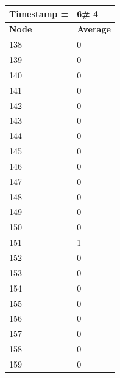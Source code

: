 \begin{tabular}{|l||l|}
\hline
\textbf{Timestamp =} & \textbf{6}\# 4\\\hline
	\textbf{Node} & \textbf{Average} \\ \hline
\hline
	138 & 0 \\ \hline
	139 & 0 \\ \hline
	140 & 0 \\ \hline
	141 & 0 \\ \hline
	142 & 0 \\ \hline
	143 & 0 \\ \hline
	144 & 0 \\ \hline
	145 & 0 \\ \hline
	146 & 0 \\ \hline
	147 & 0 \\ \hline
	148 & 0 \\ \hline
	149 & 0 \\ \hline
	150 & 0 \\ \hline
	151 & 1 \\ \hline
	152 & 0 \\ \hline
	153 & 0 \\ \hline
	154 & 0 \\ \hline
	155 & 0 \\ \hline
	156 & 0 \\ \hline
	157 & 0 \\ \hline
	158 & 0 \\ \hline
	159 & 0 \\ \hline
\end{tabular}

